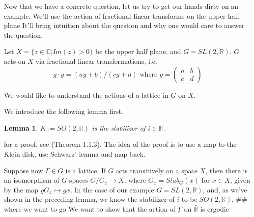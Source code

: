 \documentclass[
  12pt
]{article}
\theoremstyle{plain}
\newtheorem{lem}[thm]{Lemma}
\newcommand{\G}{\ensuremath{G}\xspace}
\newcommand{\bbc}{\ensuremath{\mathbb{C}}\xspace}
\newcommand{\sltr}{\ensuremath{SL(2, \mathbb{R})}\xspace}
\begin{document}
  Now that we have a concrete question, let us try to get our hands dirty
  on an example. We'll use the action of fractional linear transforms on
  the upper half plane
  It'll bring intuition about the question and why one would care to
  answer the question.

  Let $X = \{z \in \bbc  | Im(z) >0\}$ be the upper half plane, and $G = \sltr$.
  \G acts on $X$ via fractional linear transformations, i.e.
  $$
  g \cdot y = (ay + b)/(cy +d) \text{ where } g= \begin{pmatrix}
    a & b \\
    c & d 
  \end{pmatrix}
  $$

  We would like to understand the actions of a lattice in \G on $X$.

  We introduce the following lemma first.

  \begin{lem}
    $K:= SO(2, \mathbb{R})$ is the stabilizer of $i \in \mathbb{H}$.
\end{lem}

    for a proof, see \cite{Miyake89}(Theorem 1.1.3). The idea of the proof is to use a map to the Klein disk, use Schwarz' lemma and map back.


  Suppose now $\Gamma \in G$ is a lattice. 
  If $G$ acts transitively on a space $X$, then there is an isomorphism
  of $G$-spaces $G/G_x \rightarrow X$, where $G_x = Stab_G (x)$ for
  $x \in X$, given by the map $gG_x \mapsto gx$. In the case of our
  example $G = SL(2, \mathbb{R})$, and, as we've shown in the preceding
  lemma, we know the stabilizer of $i$ to be $SO(2,\mathbb{R})$. \#\#
  where we want to go We want to show that the action of $\Gamma$ on
  $\bar{\mathbb{R}}$ is ergodic
\end{document}
